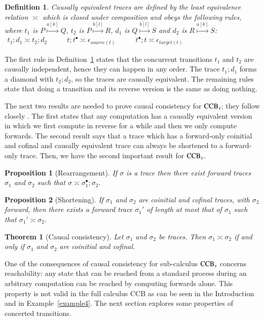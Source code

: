 \documentclass[preprint,12pt]{elsarticle}
\newtheorem{theorem}{Theorem}
\newtheorem{definition}{Definition}
\newtheorem{proposition}{Proposition}
\begin{document}
\begin{definition}\label{def:causalequivalence} \normalfont \emph{Causally equivalent} traces are defined 
by the least equivalence relation $\asymp$ which is closed under composition and obeys the following rules, 
where $t_1$ is $P \stackrel{a[k]}{\longmapsto} Q$, $t_2$ is $P \stackrel{b[l]}{\longmapsto} R$, $d_1$ is $Q \stackrel{b[l]}{\longmapsto} S$ and $d_2$ is $R \stackrel{a[k]}{\longmapsto} S$:
\\[10pt]
$\begin{array}{lll}
	t_1;d_1 \asymp t_2;d_2 \qquad & t;t^\bullet \asymp \epsilon_{source(t)}\qquad & 
t^\bullet;t \asymp \epsilon_{target(t)}
\end{array}$
\end{definition}
The first rule in Definition~\ref{def:causalequivalence} states that the concurrent transitions $t_1$ and $t_2$
are causally independent, hence they can happen in any order. The trace $t_1;d_1$ forms a diamond
with $t_2;d_2$, so the traces are causally equivalent.
The remaining rules state that doing a transition and its reverse version is the same as doing nothing. 

The next two results are needed to prove causal consistency for ${\rm CCB}_s$; they follow
closely \cite{DK04}. The first states that any computation has a causally equivalent version in
which we first compute in reverse for a while and then we only compute forwards. The second result says that
a trace which has a forward-only coinitial and cofinal and causally equivalent trace can always be shortened 
to a forward-only trace. Then, we have the second important result for ${\rm CCB}_s$.
\begin{proposition}[Rearrangement]\label{prop:rearrange}If $\sigma$ is a trace then there exist forward traces 
$\sigma_1$ and $\sigma_2$ such that $\sigma \asymp \sigma_1^\bullet;\sigma_2$.
\end{proposition}
\begin{proposition}[Shortening]\label{prop:shortening}If $\sigma_1$ and $\sigma_2$ are coinitial and cofinal traces, 
with $\sigma_2$ forward, then there exists a forward trace $\sigma_1'$ of length at most that of $\sigma_1$ 
such that $\sigma_1' \asymp \sigma_2$.
\end{proposition}
\begin{theorem}[Causal consistency]\label{prop:causcons}Let $\sigma_1$ and $\sigma_2$ be traces. Then $\sigma_1 \asymp \sigma_2$ if and only if $\sigma_1$ and $\sigma_2$ are coinitial and cofinal.
\end{theorem}
One of the consequences of causal consistency for sub-calculus ${\rm CCB}_s$ concerns reachability: 
any state that can be reached from a standard process during an arbitrary computation can be reached 
by computing forwards alone. This property is not valid in the full calculus CCB as can be seen in
the Introduction and in Example~\ref{example4}. The next section explores some properties of concerted 
transitions.
\end{document}

